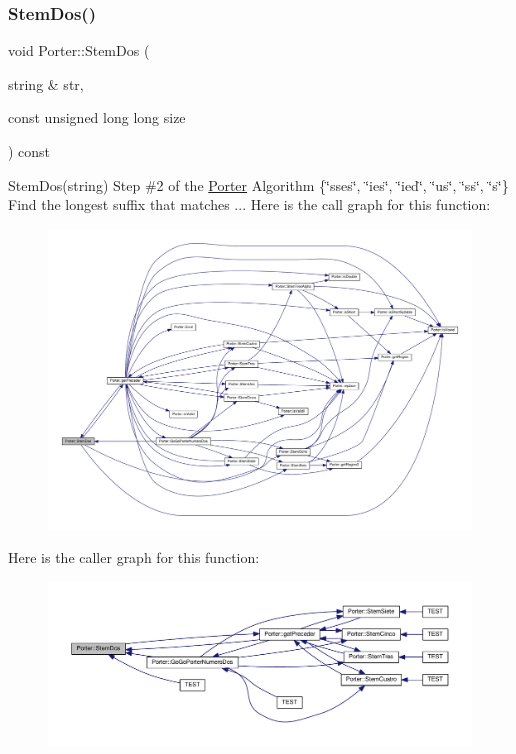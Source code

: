 \subsubsection{\texorpdfstring{Stem\+Dos()}{StemDos()}}
{\footnotesize\ttfamily void Porter\+::\+Stem\+Dos (\begin{DoxyParamCaption}\item[{string \&}]{str,  }\item[{const unsigned long long}]{size }\end{DoxyParamCaption}) const}

Stem\+Dos(string) Step \#2 of the \hyperlink{class_porter}{Porter} Algorithm \{\char`\"{}sses\char`\"{}, \char`\"{}ies\char`\"{}, \char`\"{}ied\char`\"{}, \char`\"{}us\char`\"{}, \char`\"{}ss\char`\"{}, \char`\"{}s\char`\"{}\} Find the longest suffix that matches ... Here is the call graph for this function\+:
\nopagebreak
\begin{figure}[H]
\begin{center}
\leavevmode
\includegraphics[width=350pt]{class_porter_a33838d3b5ab4963106a5c47c4a0c74e6_cgraph}
\end{center}
\end{figure}
Here is the caller graph for this function\+:
\nopagebreak
\begin{figure}[H]
\begin{center}
\leavevmode
\includegraphics[width=350pt]{class_porter_a33838d3b5ab4963106a5c47c4a0c74e6_icgraph}
\end{center}
\end{figure}
\mbox{\label{class_porter_a61853073641e47863fc6a85c786d8737}} 
